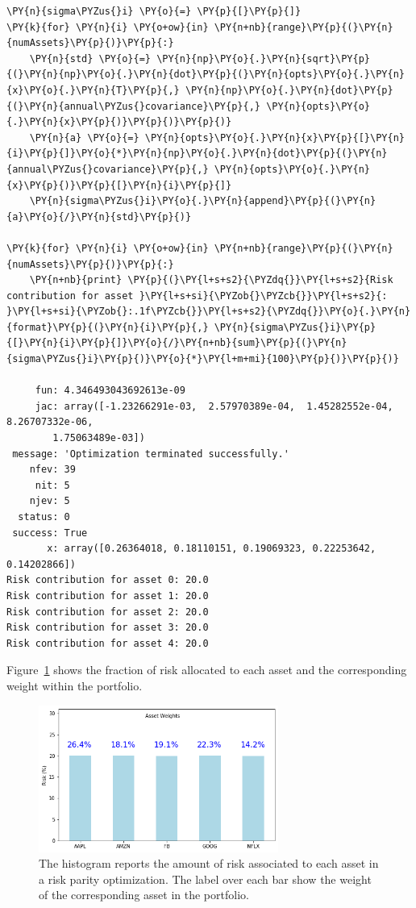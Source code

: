 \begin{tcolorbox}[breakable, size=fbox, boxrule=1pt, pad at break*=1mm,colback=cellbackground, colframe=cellborder]
\begin{Verbatim}[commandchars=\\\{\}]
\PY{n}{sigma\PYZus{}i} \PY{o}{=} \PY{p}{[}\PY{p}{]}
\PY{k}{for} \PY{n}{i} \PY{o+ow}{in} \PY{n+nb}{range}\PY{p}{(}\PY{n}{numAssets}\PY{p}{)}\PY{p}{:}
    \PY{n}{std} \PY{o}{=} \PY{n}{np}\PY{o}{.}\PY{n}{sqrt}\PY{p}{(}\PY{n}{np}\PY{o}{.}\PY{n}{dot}\PY{p}{(}\PY{n}{opts}\PY{o}{.}\PY{n}{x}\PY{o}{.}\PY{n}{T}\PY{p}{,} \PY{n}{np}\PY{o}{.}\PY{n}{dot}\PY{p}{(}\PY{n}{annual\PYZus{}covariance}\PY{p}{,} \PY{n}{opts}\PY{o}{.}\PY{n}{x}\PY{p}{)}\PY{p}{)}\PY{p}{)}
    \PY{n}{a} \PY{o}{=} \PY{n}{opts}\PY{o}{.}\PY{n}{x}\PY{p}{[}\PY{n}{i}\PY{p}{]}\PY{o}{*}\PY{n}{np}\PY{o}{.}\PY{n}{dot}\PY{p}{(}\PY{n}{annual\PYZus{}covariance}\PY{p}{,} \PY{n}{opts}\PY{o}{.}\PY{n}{x}\PY{p}{)}\PY{p}{[}\PY{n}{i}\PY{p}{]}
    \PY{n}{sigma\PYZus{}i}\PY{o}{.}\PY{n}{append}\PY{p}{(}\PY{n}{a}\PY{o}{/}\PY{n}{std}\PY{p}{)}

\PY{k}{for} \PY{n}{i} \PY{o+ow}{in} \PY{n+nb}{range}\PY{p}{(}\PY{n}{numAssets}\PY{p}{)}\PY{p}{:}
    \PY{n+nb}{print} \PY{p}{(}\PY{l+s+s2}{\PYZdq{}}\PY{l+s+s2}{Risk contribution for asset }\PY{l+s+si}{\PYZob{}\PYZcb{}}\PY{l+s+s2}{: }\PY{l+s+si}{\PYZob{}:.1f\PYZcb{}}\PY{l+s+s2}{\PYZdq{}}\PY{o}{.}\PY{n}{format}\PY{p}{(}\PY{n}{i}\PY{p}{,} \PY{n}{sigma\PYZus{}i}\PY{p}{[}\PY{n}{i}\PY{p}{]}\PY{o}{/}\PY{n+nb}{sum}\PY{p}{(}\PY{n}{sigma\PYZus{}i}\PY{p}{)}\PY{o}{*}\PY{l+m+mi}{100}\PY{p}{)}\PY{p}{)}

     fun: 4.346493043692613e-09
     jac: array([-1.23266291e-03,  2.57970389e-04,  1.45282552e-04,
8.26707332e-06,
        1.75063489e-03])
 message: 'Optimization terminated successfully.'
    nfev: 39
     nit: 5
    njev: 5
  status: 0
 success: True
       x: array([0.26364018, 0.18110151, 0.19069323, 0.22253642, 0.14202866])
Risk contribution for asset 0: 20.0
Risk contribution for asset 1: 20.0
Risk contribution for asset 2: 20.0
Risk contribution for asset 3: 20.0
Risk contribution for asset 4: 20.0
    \end{Verbatim}
\end{tcolorbox}

Figure~\ref{fig:risk_parity} shows the fraction of risk allocated to each asset and the corresponding weight within the portfolio.

\begin{figure}[htb]
	\centering
	\includegraphics[width=0.7\textwidth]{figures/risk_parity.png}
	\caption{The histogram reports the amount of risk associated to each asset in a risk parity optimization. The label over each bar show the weight of the corresponding asset in the portfolio.}
	\label{fig:risk_parity}
\end{figure}


